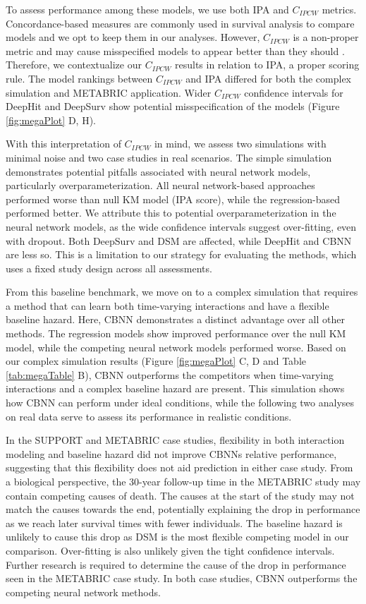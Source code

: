 \documentclass[APA,LATO1COL]{WileyNJD-v2}
\begin{document}
To assess performance among these models, we use both IPA and
\(C_{IPCW}\) metrics. Concordance-based measures are commonly used in
survival analysis to compare models and we opt to keep them in our
analyses. However, \(C_{IPCW}\) is a non-proper metric and may cause
misspecified models to appear better than they should
\citep{cindexfails2019}. Therefore, we contextualize our \(C_{IPCW}\)
results in relation to IPA, a proper scoring rule. The model rankings
between \(C_{IPCW}\) and IPA differed for both the complex simulation
and METABRIC application. Wider \(C_{IPCW}\) confidence intervals for
DeepHit and DeepSurv show potential misspecification of the models
(Figure \ref{fig:megaPlot} D, H).

With this interpretation of \(C_{IPCW}\) in mind, we assess two
simulations with minimal noise and two case studies in real scenarios.
The simple simulation demonstrates potential pitfalls associated with
neural network models, particularly overparameterization. All neural
network-based approaches performed worse than null KM model (IPA score),
while the regression-based performed better. We attribute this to
potential overparameterization in the neural network models, as the wide
confidence intervals suggest over-fitting, even with dropout. Both
DeepSurv and DSM are affected, while DeepHit and CBNN are less so. This
is a limitation to our strategy for evaluating the methods, which uses a
fixed study design across all assessments.

From this baseline benchmark, we move on to a complex simulation that
requires a method that can learn both time-varying interactions and have
a flexible baseline hazard. Here, CBNN demonstrates a distinct advantage
over all other methods. The regression models show improved performance
over the null KM model, while the competing neural network models
performed worse. Based on our complex simulation results (Figure
\ref{fig:megaPlot} C, D and Table \ref{tab:megaTable} B), CBNN
outperforms the competitors when time-varying interactions and a complex
baseline hazard are present. This simulation shows how CBNN can perform
under ideal conditions, while the following two analyses on real data
serve to assess its performance in realistic conditions.

In the SUPPORT and METABRIC case studies, flexibility in both
interaction modeling and baseline hazard did not improve CBNNs relative
performance, suggesting that this flexibility does not aid prediction in
either case study. From a biological perspective, the 30-year follow-up
time in the METABRIC study may contain competing causes of death. The
causes at the start of the study may not match the causes towards the
end, potentially explaining the drop in performance as we reach later
survival times with fewer individuals. The baseline hazard is unlikely
to cause this drop as DSM is the most flexible competing model in our
comparison. Over-fitting is also unlikely given the tight confidence
intervals. Further research is required to determine the cause of the
drop in performance seen in the METABRIC case study. In both case
studies, CBNN outperforms the competing neural network methods.
\end{document}
